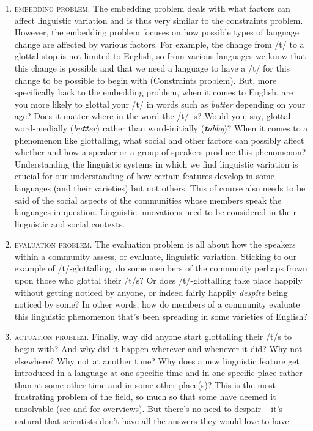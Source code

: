 \begin{enumerate}
    \item \textsc{embedding problem}. The embedding problem deals with what factors can affect linguistic variation and is thus very similar to the constraints problem. However, the embedding problem focuses on how possible types of language change are affected by various factors. For example, the change from /t/ to a glottal stop is not limited to English, so from various languages we know that this change is possible and that we need a language to have a /t/ for this change to be possible to begin with (Constraints problem). But, more specifically back to the embedding problem, when it comes to English, are you more likely to glottal your /t/ in words such as \emph{butter} depending on your age? Does it matter where in the word the /t/ is? Would you, say, glottal word-medially (\emph{bu\textbf{tt}er}) rather than word-initially (\emph{\textbf{t}abby})? When it comes to a phenomenon like glottalling, what social and other factors can possibly affect whether and how a speaker or a group of speakers produce this phenomenon? Understanding the linguistic systems in which we find linguistic variation is crucial for our understanding of how certain features develop in some languages (and their varieties) but not others. This of course also needs to be said of the social aspects of the communities whose members speak the languages in question. Linguistic innovations need to be considered in their linguistic and social contexts.
    \item \textsc{evaluation problem}. The evaluation problem is all about how the speakers within a community assess, or evaluate, linguistic variation. Sticking to our example of /t/-glottalling, do some members of the community perhaps frown upon those who glottal their /t/s? Or does /t/-glottalling take place happily without getting noticed by anyone, or indeed fairly happily \emph{despite} being noticed by some? In other words, how do members of a community evaluate this linguistic phenomenon that's been spreading in some varieties of English? 
    \item \textsc{actuation problem}. Finally, why did anyone start glottalling their /t/s to begin with? And why did it happen wherever and whenever it did? Why not elsewhere? Why not at another time? Why does a new linguistic feature get introduced in a language at one specific time and in one specific place rather than at some other time and in some other place(s)? This is the most frustrating problem of the field, so much so that some have deemed it unsolvable (see \citealp{StevensHarrington2014} and \citealp{Walkden2017actuation} for overviews). But there's no need to despair -- it's natural that scientists don't have all the answers they would love to have.
\end{enumerate}

